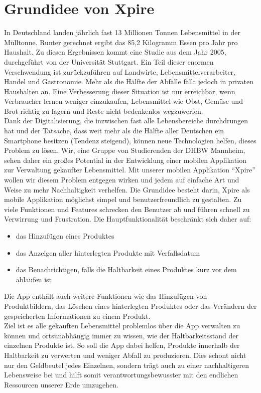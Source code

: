 \section{Grundidee von Xpire}
In Deutschland landen jährlich fast 13 Millionen Tonnen Lebensmittel in der Mülltonne. Runter gerechnet ergibt das 85,2 Kilogramm Essen pro Jahr pro Haushalt. Zu diesen Ergebnissen kommt eine Studie aus dem Jahr 2005, durchgeführt von der Universität Stuttgart.\autocite[vgl.][]{BundesministeriumfurErnahrungLandwirtschaftundVerbraucherschutz.2012} Ein Teil dieser enormen Verschwendung ist zurückzuführen auf Landwirte, Lebensmittelverarbeiter, Handel und Gastronomie. Mehr als die Hälfte der Abfälle fällt jedoch in privaten Haushalten an. Eine Verbesserung dieser Situation ist nur erreichbar, wenn Verbraucher lernen weniger einzukaufen, Lebensmittel wie Obst, Gemüse und Brot richtig zu lagern und Reste nicht bedenkenlos wegzuwerfen.\\
Dank der Digitalisierung, die inzwischen fast alle Lebensbereiche durchdrungen hat und der Tatsache, dass weit mehr als die Hälfte aller Deutschen ein Smartphone besitzen (Tendenz steigend), können neue Technologien helfen, dieses Problem zu lösen. Wir, eine Gruppe von Studierenden der DHBW Mannheim, sehen daher ein großes Potential in der Entwicklung einer mobilen Applikation zur Verwaltung gekaufter Lebensmittel. Mit unserer mobilen Applikation \enquote{Xpire} wollen wir diesem Problem entgegen wirken und jedem auf einfache Art und Weise zu mehr Nachhaltigkeit verhelfen.
Die Grundidee besteht darin, Xpire als mobile Applikation möglichst simpel und benutzerfreundlich zu gestalten. Zu viele Funktionen und Features schrecken den Benutzer ab und führen schnell zu Verwirrung und Frustration. Die Hauptfunktionalität beschränkt sich daher auf:
\begin{itemize}[noitemsep]
	\item das Hinzufügen eines Produktes
	\item das Anzeigen aller hinterlegten Produkte mit Verfallsdatum
	\item das Benachrichtigen, falls die Haltbarkeit eines Produktes kurz vor dem ablaufen ist
\end{itemize}
Die App enthält auch weitere Funktionen wie das Hinzufügen von Produktbildern, das Löschen eines hinterlegten Produktes oder das Verändern der gespeicherten  Informationen zu einem Produkt.\\
Ziel ist es alle gekauften Lebensmittel problemlos über die App verwalten zu können und ortsunabhängig immer zu wissen, wie der Haltbarkeitsstand der einzelnen Produkte ist. So soll die App dabei helfen, Produkte innerhalb der Haltbarkeit zu verwerten und weniger Abfall zu produzieren. Dies schont nicht nur den Geldbeutel jedes Einzelnen, sondern trägt auch zu einer nachhaltigeren Lebensweise bei und hilft somit verantwortungsbewusster mit den endlichen Ressourcen unserer Erde umzugehen.

